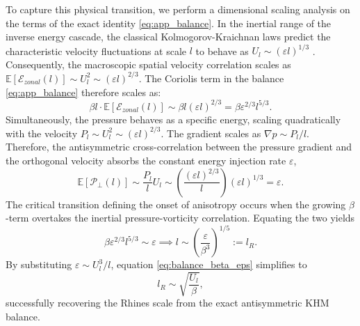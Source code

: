 \documentclass[11pt,a4paper]{article}
\numberwithin{equation}{section}
\numberwithin{theorem}{section}
\numberwithin{remark}{section}
\numberwithin{definition}{section}
\begin{document}
To capture this physical transition, we perform a dimensional scaling analysis on the terms of the exact identity \eqref{eq:app_balance}. In the inertial range of the inverse energy cascade, the classical Kolmogorov-Kraichnan laws predict the characteristic velocity fluctuations at scale $l$ to behave as $U_l \sim (\varepsilon l)^{1/3}$ \cite{kolmogorov2, Kraichnan}. Consequently, the macroscopic spatial velocity correlation scales as $\mathbb{E}[\mathcal{E}_{zonal}(l)] \sim U_l^2 \sim (\varepsilon l)^{2/3}$. The Coriolis term in the balance \eqref{eq:app_balance} therefore scales as:
\begin{equation}\label{eq:scaling_coriolis}
    \beta l \cdot \mathbb{E}[\mathcal{E}_{zonal}(l)] \sim \beta l (\varepsilon l)^{2/3} = \beta \varepsilon^{2/3} l^{5/3}.
\end{equation}
Simultaneously, the pressure behaves as a specific energy, scaling quadratically with the velocity $P_l \sim U_l^2 \sim (\varepsilon l)^{2/3}$. The gradient scales as $\nabla p \sim P_l/l$. Therefore, the antisymmetric cross-correlation between the pressure gradient and the orthogonal velocity absorbs the constant energy injection rate $\varepsilon$,
\begin{equation}
    \mathbb{E}[\mathcal{P}_\perp(l)] \sim \frac{P_l}{l} U_l \sim \left(\frac{(\varepsilon l)^{2/3}}{l}\right) (\varepsilon l)^{1/3} = \varepsilon.
\end{equation}
The critical transition defining the onset of anisotropy occurs when the growing $\beta$-term overtakes the inertial pressure-vorticity correlation. Equating the two yields
\begin{equation}\label{eq:balance_beta_eps}
    \beta \varepsilon^{2/3} l^{5/3} \sim \varepsilon \implies l \sim \left( \frac{\varepsilon}{\beta^3} \right)^{1/5} := l_R.
\end{equation}
By substituting $\varepsilon \sim U_l^3 / l$, equation \eqref{eq:balance_beta_eps} simplifies to
\begin{equation}
    l_R \sim \sqrt{\frac{U_l}{\beta}},
\end{equation}
successfully recovering the Rhines scale from the exact antisymmetric KHM balance.
\end{document}
